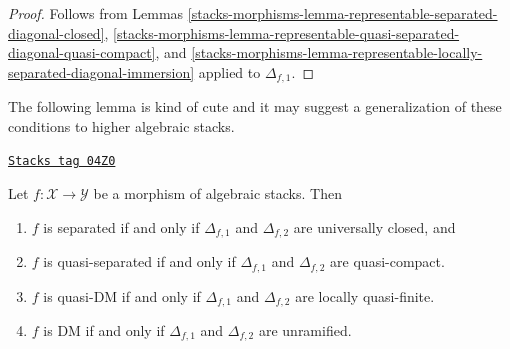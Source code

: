 \begin{proof}
Follows from
Lemmas \ref{stacks-morphisms-lemma-representable-separated-diagonal-closed},
\ref{stacks-morphisms-lemma-representable-quasi-separated-diagonal-quasi-compact}, and
\ref{stacks-morphisms-lemma-representable-locally-separated-diagonal-immersion}
applied to $\Delta_{f, 1}$.
\end{proof}

The following lemma is kind of cute and it may suggest a generalization
of these conditions to higher algebraic stacks.

\begin{lemma}
\label{stacks-morphisms-lemma-definition-separated}
\href{https://stacks.math.columbia.edu/tag/04Z0}{\texttt{Stacks tag 04Z0}}

Let $f : \mathcal{X} \to \mathcal{Y}$ be a morphism of algebraic stacks.
Then
\begin{enumerate}
\item $f$ is separated if and only if $\Delta_{f, 1}$ and $\Delta_{f, 2}$
are universally closed, and
\item $f$ is quasi-separated if and only if $\Delta_{f, 1}$ and $\Delta_{f, 2}$
are quasi-compact.
\item $f$ is quasi-DM if and only if $\Delta_{f, 1}$ and $\Delta_{f, 2}$
are locally quasi-finite.
\item $f$ is DM if and only if $\Delta_{f, 1}$ and $\Delta_{f, 2}$
are unramified.
\end{enumerate}
\end{lemma}

